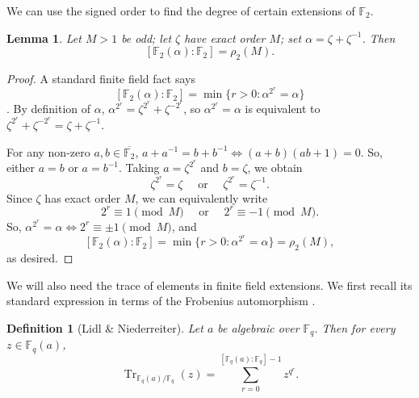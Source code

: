 \documentclass[a4paper]{article}
\newtheorem{lemma}[theorem]{Lemma}
\newtheorem{definition}[theorem]{Definition}
\newcommand{\F}{\mathbb{F}}
\newcommand{\Tr}[2][]{\operatorname{Tr}_{#1}\!\left( #2 \right)}
\begin{document}
	We can use the signed order to find the degree of certain extensions of $\F_2$.
	\begin{lemma}\label{fieldExtensionSize}
		Let $M > 1$ be odd; let $\zeta$ have exact order $M$; set $\alpha = \zeta + \zeta^{-1}$.
		Then
		\begin{equation*}
			\left[\F_2(\alpha) : \F_2\right] = \rho_2(M).
		\end{equation*}
	\end{lemma}
	\begin{proof}
		A standard finite field fact says
		\begin{equation*}
			\left[\F_2(\alpha) : \F_2\right] = \min{\{r > 0 : \alpha^{2^r} = \alpha\}}
		\end{equation*}
		\cite[Theorem 2.14, p.~52]{lidl-niederreiter}.
		By definition of $\alpha$, $\alpha^{2^r} = \zeta^{2^r} + \zeta^{-2^r}$, so $\alpha^{2^r} = \alpha$ is equivalent to $\zeta^{2^r} + \zeta^{-2^r} = \zeta + \zeta^{-1}$.
		
		For any non-zero $a,b \in \overline{\F_2}$, $a + a^{-1} = b + b^{-1} \iff (a+b)(ab+1) = 0$.
		So, either $a = b$ or $a = b^{-1}$.
		Taking $a = \zeta^{2^r}$ and $b = \zeta$, we obtain
		\begin{equation*}
			\zeta^{2^r} = \zeta \quad\text{ or }\quad \zeta^{2^r} = \zeta^{-1}.
		\end{equation*}
		Since $\zeta$ has exact order $M$, we can equivalently write
		\begin{equation*}
			2^{r} \equiv 1 \pmod{M} \quad\text{ or }\quad 2^r \equiv -1 \pmod{M}.
		\end{equation*}
		So, $\alpha^{2^r} = \alpha \iff 2^r \equiv \pm 1 \pmod{M}$, and
		\begin{equation*}
			\left[\F_2(\alpha) : \F_2\right] = \min{\{r > 0 : \alpha^{2^r} = \alpha\}} = \rho_2(M),
		\end{equation*}
		as desired.
	\end{proof}
	
	We will also need the trace of elements in finite field extensions.
	We first recall its standard expression in terms of the Frobenius automorphism \cite[Definition 2.22, p.~54]{lidl-niederreiter}.
	\begin{definition}[Lidl \& Niederreiter]\label{fieldTrace}
		Let $a$ be algebraic over $\F_q$.
		Then for every $z \in \F_q(a)$,
		\begin{equation*}
			\Tr[\F_q(a) / \F_q]{z} = \sum_{r=0}^{\left[\F_q(a) : \F_q\right] - 1}{z^{q^r}}.
		\end{equation*}
	\end{definition}
\end{document}
